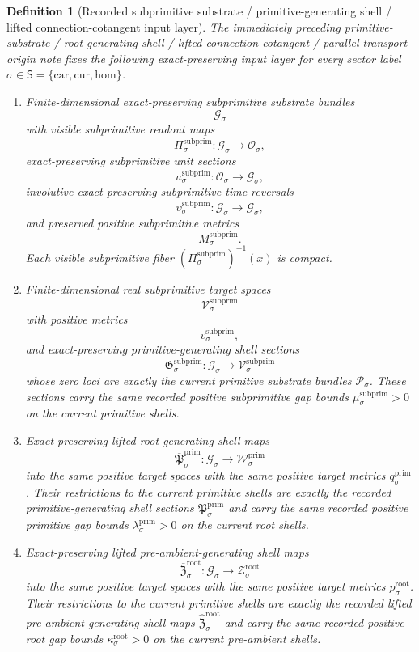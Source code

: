 \documentclass[11pt]{article}
\newcommand{\SectorSet}{\mathsf S}
\newcommand{\Car}{\mathrm{car}}
\newcommand{\Cur}{\mathrm{cur}}
\newcommand{\Hom}{\mathrm{hom}}
\newcommand{\ObjClass}[1]{\mathcal O_{#1}}
\newcommand{\RootTarget}[1]{\mathcal Z_{#1}^{\mathrm{root}}}
\newcommand{\RootTargetMetric}[1]{p_{#1}^{\mathrm{root}}}
\newcommand{\RootGap}[1]{\kappa_{#1}^{\mathrm{root}}}
\newcommand{\PrimTarget}[1]{\mathcal W_{#1}^{\mathrm{prim}}}
\newcommand{\PrimTargetMetric}[1]{q_{#1}^{\mathrm{prim}}}
\newcommand{\PrimGap}[1]{\lambda_{#1}^{\mathrm{prim}}}
\newcommand{\SubprimTarget}[1]{\mathcal V_{#1}^{\mathrm{subprim}}}
\newcommand{\SubprimTargetMetric}[1]{v_{#1}^{\mathrm{subprim}}}
\newcommand{\SubprimGap}[1]{\mu_{#1}^{\mathrm{subprim}}}
\newcommand{\PrimSpace}[1]{\mathcal P_{#1}}
\newcommand{\PrimSection}[1]{\mathfrak P_{#1}^{\mathrm{prim}}}
\newcommand{\PrimLiftedPreAmbient}[1]{\widehat{\mathfrak Z}_{#1}^{\mathrm{root}}}
\newcommand{\SubprimSpace}[1]{\mathcal G_{#1}}
\newcommand{\SubprimRead}[1]{\Pi_{#1}^{\mathrm{subprim}}}
\newcommand{\SubprimUnit}[1]{u_{#1}^{\mathrm{subprim}}}
\newcommand{\SubprimTimeRev}[1]{\upsilon_{#1}^{\mathrm{subprim}}}
\newcommand{\SubprimMetric}[1]{M_{#1}^{\mathrm{subprim}}}
\newcommand{\SubprimSection}[1]{\mathfrak G_{#1}^{\mathrm{subprim}}}
\newcommand{\SubprimLiftedRoot}[1]{\overline{\mathfrak P}_{#1}^{\mathrm{prim}}}
\newcommand{\SubprimLiftedPreAmbient}[1]{\overline{\mathfrak Z}_{#1}^{\mathrm{root}}}
\newtheorem{definition}{Definition}
\begin{document}
\begin{definition}[Recorded subprimitive substrate / primitive-generating shell / lifted connection-cotangent input layer]
\label{def:recorded_subprimitive_layer}
The immediately preceding primitive-substrate / root-generating shell / lifted connection-cotangent / parallel-transport origin note fixes the following exact-preserving input layer for every sector label \(\sigma\in\SectorSet=\{\Car,\Cur,\Hom\}\).
\begin{enumerate}
    \item Finite-dimensional exact-preserving subprimitive substrate bundles
    \[
    \SubprimSpace{\sigma}
    \]
    with visible subprimitive readout maps
    \[
    \SubprimRead{\sigma}:\SubprimSpace{\sigma}\to\ObjClass{\sigma},
    \]
    exact-preserving subprimitive unit sections
    \[
    \SubprimUnit{\sigma}:\ObjClass{\sigma}\to\SubprimSpace{\sigma},
    \]
    involutive exact-preserving subprimitive time reversals
    \[
    \SubprimTimeRev{\sigma}:\SubprimSpace{\sigma}\to\SubprimSpace{\sigma},
    \]
    and preserved positive subprimitive metrics
    \[
    \SubprimMetric{\sigma}.
    \]
    Each visible subprimitive fiber \((\SubprimRead{\sigma})^{-1}(x)\) is compact.
    \item Finite-dimensional real subprimitive target spaces
    \[
    \SubprimTarget{\sigma}
    \]
    with positive metrics
    \[
    \SubprimTargetMetric{\sigma},
    \]
    and exact-preserving primitive-generating shell sections
    \[
    \SubprimSection{\sigma}:\SubprimSpace{\sigma}\to\SubprimTarget{\sigma}
    \]
    whose zero loci are exactly the current primitive substrate bundles \(\PrimSpace{\sigma}\). These sections carry the same recorded positive subprimitive gap bounds \(\SubprimGap{\sigma}>0\) on the current primitive shells.
    \item Exact-preserving lifted root-generating shell maps
    \[
    \SubprimLiftedRoot{\sigma}:\SubprimSpace{\sigma}\to\PrimTarget{\sigma}
    \]
    into the same positive target spaces with the same positive target metrics \(\PrimTargetMetric{\sigma}\). Their restrictions to the current primitive shells are exactly the recorded primitive-generating shell sections \(\PrimSection{\sigma}\) and carry the same recorded positive primitive gap bounds \(\PrimGap{\sigma}>0\) on the current root shells.
    \item Exact-preserving lifted pre-ambient-generating shell maps
    \[
    \SubprimLiftedPreAmbient{\sigma}:\SubprimSpace{\sigma}\to\RootTarget{\sigma}
    \]
    into the same positive target spaces with the same positive target metrics \(\RootTargetMetric{\sigma}\). Their restrictions to the current primitive shells are exactly the recorded lifted pre-ambient-generating shell maps \(\PrimLiftedPreAmbient{\sigma}\) and carry the same recorded positive root gap bounds \(\RootGap{\sigma}>0\) on the current pre-ambient shells.

\end{enumerate}
\end{definition}
\end{document}
